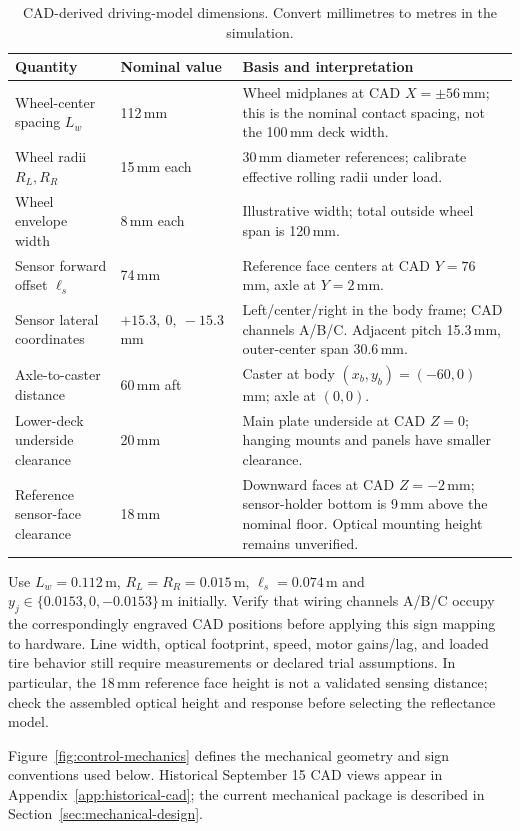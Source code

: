 \begin{table}[H]
\centering
\caption{CAD-derived driving-model dimensions. Convert millimetres to metres in the simulation.}
\label{tab:cad-control-dimensions}
\small
\begin{tabular}{L{4.6cm} L{3.2cm} L{8.4cm}}
\toprule
Quantity & Nominal value & Basis and interpretation \\
\midrule
Wheel-center spacing $L_w$ & 112\,mm & Wheel midplanes at CAD $X=\pm56$\,mm; this is the nominal contact spacing, not the 100\,mm deck width. \\
Wheel radii $R_L,R_R$ & 15\,mm each & 30\,mm diameter references; calibrate effective rolling radii under load. \\
Wheel envelope width & 8\,mm each & Illustrative width; total outside wheel span is 120\,mm. \\
Sensor forward offset $\ell_s$ & 74\,mm & Reference face centers at CAD $Y=76$\,mm, axle at $Y=2$\,mm. \\
Sensor lateral coordinates & $+15.3,\ 0,\ -15.3$\,mm & Left/center/right in the body frame; CAD channels A/B/C. Adjacent pitch 15.3\,mm, outer-center span 30.6\,mm. \\
Axle-to-caster distance & 60\,mm aft & Caster at body $(x_b,y_b)=(-60,0)$\,mm; axle at $(0,0)$. \\
Lower-deck underside clearance & 20\,mm & Main plate underside at CAD $Z=0$; hanging mounts and panels have smaller clearance. \\
Reference sensor-face clearance & 18\,mm & Downward faces at CAD $Z=-2$\,mm; sensor-holder bottom is 9\,mm above the nominal floor. Optical mounting height remains unverified. \\
\bottomrule
\end{tabular}
\end{table}

Use $L_w=0.112$\,m, $R_L=R_R=0.015$\,m, $\ell_s=0.074$\,m and $y_j\in\{0.0153,0,-0.0153\}$\,m initially. Verify that wiring channels A/B/C occupy the correspondingly engraved CAD positions before applying this sign mapping to hardware. Line width, optical footprint, speed, motor gains/lag, and loaded tire behavior still require measurements or declared trial assumptions. In particular, the 18\,mm reference face height is not a validated sensing distance; check the assembled optical height and response before selecting the reflectance model.

Figure~\ref{fig:control-mechanics} defines the mechanical geometry and sign conventions used below. Historical September 15 CAD views appear in Appendix~\ref{app:historical-cad}; the current mechanical package is described in Section~\ref{sec:mechanical-design}.

